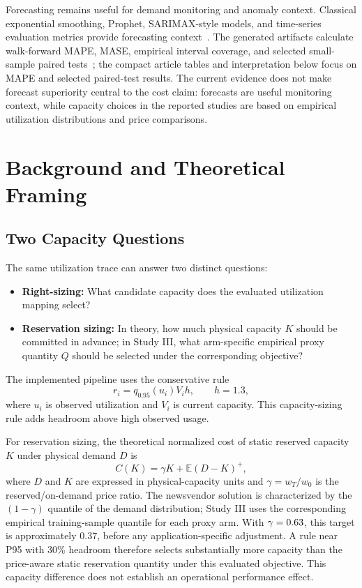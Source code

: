 \documentclass[11pt]{article}
\newcommand{\E}{\mathbb{E}}
\newcommand{\pos}[1]{\left(#1\right)^+}
\begin{document}
Forecasting remains useful for demand monitoring and anomaly context.
Classical exponential smoothing, Prophet, SARIMAX-style models, and
time-series evaluation metrics provide forecasting
context~\cite{taylor2018prophet,hyndman2008forecast,kirchoff2024provisioning,agullo2025forecasting}.
The generated artifacts calculate walk-forward MAPE, MASE, empirical interval
coverage, and selected small-sample paired
tests~\cite{hyndman2006mase,diebold1995comparing,harvey1997testing}; the
compact article tables and interpretation below focus on MAPE and selected
paired-test results.
The current evidence does not make forecast superiority central to the cost
claim: forecasts are useful monitoring context, while capacity choices in the
reported studies are based on empirical utilization distributions and price
comparisons.

\section{Background and Theoretical Framing}

\subsection{Two Capacity Questions}

The same utilization trace can answer two distinct questions:

\begin{itemize}
\item \textbf{Right-sizing:} What candidate capacity does the evaluated
utilization mapping select?
\item \textbf{Reservation sizing:} In theory, how much physical capacity \(K\)
should be committed in advance; in Study III, what arm-specific empirical
proxy quantity \(Q\) should be selected under the corresponding objective?
\end{itemize}

The implemented pipeline uses the conservative rule
\begin{equation}
r_i = q_{0.95}(u_i)V_i h,\qquad h=1.3,
\end{equation}
where $u_i$ is observed utilization and $V_i$ is current capacity. This
capacity-sizing rule adds headroom above high observed usage.

For reservation sizing, the theoretical normalized cost of static reserved
capacity \(K\) under physical demand \(D\) is
\begin{equation}
C(K) = \gamma K + \E\pos{D-K},
\end{equation}
where \(D\) and \(K\) are expressed in physical-capacity units and
\(\gamma=w_T/w_0\) is the reserved/on-demand price ratio. The newsvendor
solution is characterized by the \((1-\gamma)\) quantile of the demand
distribution; Study III uses the corresponding empirical training-sample
quantile for each proxy arm. With
$\gamma=0.63$, this target is approximately $0.37$, before any
application-specific adjustment. A rule near P95 with 30\% headroom therefore
selects substantially more capacity than the price-aware static reservation
quantity under this evaluated objective. This capacity difference does not
establish an operational performance effect.
\end{document}
